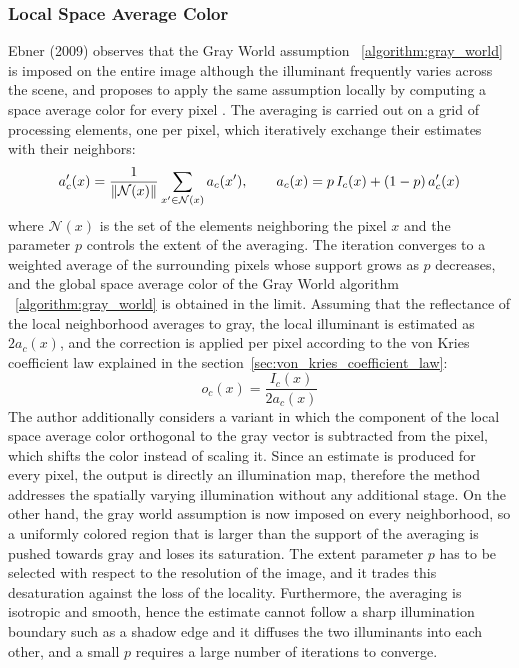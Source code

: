 \subsubsection{Local Space Average Color}
\label{algorithm:local_space_average_color}
Ebner (2009) observes that the Gray World assumption ~\ref{algorithm:gray_world} is imposed on the entire image although the illuminant frequently varies across the scene, and proposes to apply the same assumption locally by computing a space average color for every pixel \cite{ebnerLocalSpaceAverageColor}. The averaging is carried out on a grid of processing elements, one per pixel, which iteratively exchange their estimates with their neighbors:
\begin{equation}
a'_c(x) = \frac{1}{\left\lVert\mathcal{N}(x)\right\rVert} \sum_{x' \in \mathcal{N}(x)} a_c(x'), \qquad
a_c(x) = p \, I_c(x) + (1 - p) \, a'_c(x)
\end{equation}
where $\mathcal{N}(x)$ is the set of the elements neighboring the pixel $x$ and the parameter $p$ controls the extent of the averaging. The iteration converges to a weighted average of the surrounding pixels whose support grows as $p$ decreases, and the global space average color of the Gray World algorithm ~\ref{algorithm:gray_world} is obtained in the limit. Assuming that the reflectance of the local neighborhood averages to gray, the local illuminant is estimated as $2a_c(x)$, and the correction is applied per pixel according to the von Kries coefficient law explained in the section~\ref{sec:von_kries_coefficient_law}:
\begin{equation}
o_c(x) = \frac{I_c(x)}{2 a_c(x)}
\end{equation}
The author additionally considers a variant in which the component of the local space average color orthogonal to the gray vector is subtracted from the pixel, which shifts the color instead of scaling it. Since an estimate is produced for every pixel, the output is directly an illumination map, therefore the method addresses the spatially varying illumination without any additional stage. On the other hand, the gray world assumption is now imposed on every neighborhood, so a uniformly colored region that is larger than the support of the averaging is pushed towards gray and loses its saturation. The extent parameter $p$ has to be selected with respect to the resolution of the image, and it trades this desaturation against the loss of the locality. Furthermore, the averaging is isotropic and smooth, hence the estimate cannot follow a sharp illumination boundary such as a shadow edge and it diffuses the two illuminants into each other, and a small $p$ requires a large number of iterations to converge.

